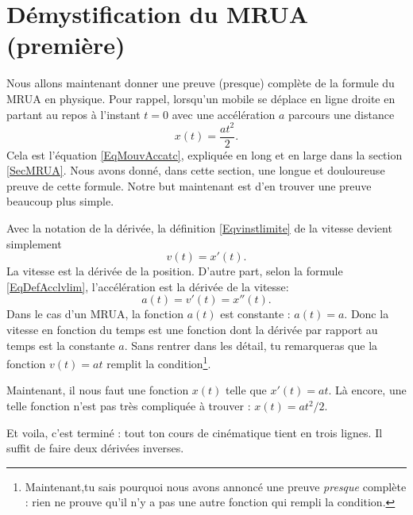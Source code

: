 					\section{Démystification du MRUA (première)}		\label{SecDemMRUAun}

Nous allons maintenant donner une preuve (presque) complète de la formule du MRUA en physique. Pour rappel, lorsqu'un mobile se déplace en ligne droite en partant au repos à l'instant $t=0$ avec une accélération $a$ parcours une distance
\begin{equation}
	x(t)=\frac{ at^2 }{ 2 }.
\end{equation}
Cela est l'équation \eqref{EqMouvAccatc}, expliquée en long et en large dans la section \ref{SecMRUA}. Nous avons donné, dans cette section, une longue et douloureuse preuve de cette formule. Notre but maintenant est d'en trouver une preuve beaucoup plus simple.

Avec la notation de la dérivée, la définition \eqref{Eqvinstlimite} de la vitesse devient simplement
\begin{equation}
	v(t)=x'(t).
\end{equation}
La vitesse est la dérivée de la position. D'autre part, selon la formule \eqref{EqDefAcclvlim}, l'accélération est la dérivée de la vitesse:
\begin{equation}
	a(t)=v'(t)=x''(t).
\end{equation}
Dans le cas d'un MRUA, la fonction $a(t)$ est constante : $a(t)=a$. Donc la vitesse en fonction du temps est une fonction dont la dérivée par rapport au temps est la constante $a$. Sans rentrer dans les détail, tu remarqueras que la fonction $v(t)=at$ remplit la condition\footnote{Maintenant,tu sais pourquoi nous avons annoncé une preuve \emph{presque} complète : rien ne prouve qu'il n'y a pas une autre fonction qui rempli la condition.}.

Maintenant, il nous faut une fonction $x(t)$ telle que $x'(t)=at$. Là encore, une telle fonction n'est pas très compliquée à trouver : $x(t)=at^2/2$.

Et voila, c'est terminé : tout ton cours de cinématique tient en trois lignes. Il suffit de faire deux dérivées inverses.

